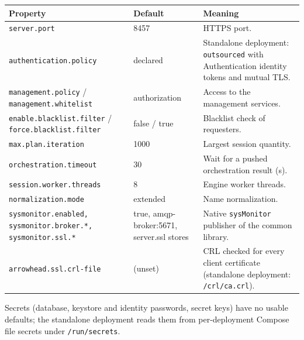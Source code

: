 \documentclass[a4paper]{arrowhead}
\begin{document}
\noindent\begin{longtable}{| p{5.4cm} | p{3.4cm} | p{6.4cm} |} \hline
\rowcolor{gray!33} Property & Default & Meaning \\ \hline \endhead
\texttt{server.\allowbreak{}port} & 8457 & HTTPS port. \\ \hline
\texttt{authentication.\allowbreak{}policy} & declared & Standalone deployment: \texttt{outsourced} with Authentication identity tokens and mutual TLS. \\ \hline
\texttt{management.\allowbreak{}policy} / \texttt{management.\allowbreak{}whitelist} & authorization & Access to the management services. \\ \hline
\texttt{enable.\allowbreak{}blacklist.\allowbreak{}filter} / \texttt{force.\allowbreak{}blacklist.\allowbreak{}filter} & false / true & Blacklist check of requesters. \\ \hline
\texttt{max.\allowbreak{}plan.\allowbreak{}iteration} & 1000 & Largest session quantity. \\ \hline
\texttt{orchestration.\allowbreak{}timeout} & 30 & Wait for a pushed orchestration result (s). \\ \hline
\texttt{session.\allowbreak{}worker.\allowbreak{}threads} & 8 & Engine worker threads. \\ \hline
\texttt{normalization.\allowbreak{}mode} & extended & Name normalization. \\ \hline
\texttt{sysmonitor.\allowbreak{}enabled,\allowbreak{} sysmonitor.\allowbreak{}broker.\allowbreak{}*,\allowbreak{} sysmonitor.\allowbreak{}ssl.\allowbreak{}*} & true, amqp-broker:5671, server.ssl stores & Native \texttt{sysMonitor} publisher of the common library. \\ \hline
\texttt{arrowhead.\allowbreak{}ssl.\allowbreak{}crl-\allowbreak{}file} & (unset) & CRL checked for every client certificate (standalone deployment: \texttt{/\allowbreak{}crl/\allowbreak{}ca.\allowbreak{}crl}). \\ \hline
\end{longtable}

Secrets (database, keystore and identity passwords, secret keys) have no usable defaults; the standalone deployment reads them from per-deployment Compose file secrets under \texttt{/\allowbreak{}run/\allowbreak{}secrets}.
\end{document}

